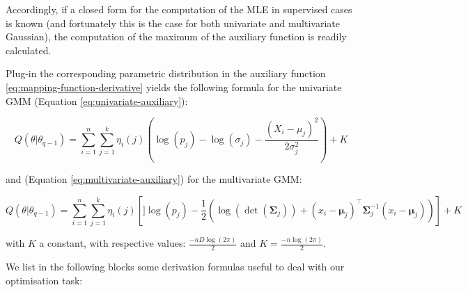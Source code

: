 Accordingly, if a closed form for the computation of the MLE in
supervised cases is known (and fortunately this is the case for both univariate and multivariate Gaussian), the computation of the maximum of the
auxiliary function is readily calculated.

Plug-in the corresponding parametric distribution in the auxiliary function \eqref{eq:mapping-function-derivative} yields the following formula for the univariate GMM (Equation
\eqref{eq:univariate-auxiliary}):

\begin{equation}
Q(\theta| \theta_{q-1}) = \sum_{i=1}^n \sum_{j=1}^k \eta_i(j) \left( \log (p_j) - \log (\sigma_j) - \frac{(X_i-\mu_j)^2}{2\sigma_j^2} \right) + K
\label{eq:univariate-auxiliary}
\end{equation}

and (Equation \eqref{eq:multivariate-auxiliary}) for the multivariate GMM:

\begin{equation}
Q(\theta| \theta_{q-1}) = \sum_{i=1}^n \sum_{j=1}^k \eta_i(j) \left[] \log (p_j) - \frac{1}{2} \left( \log(\operatorname{det}(\boldsymbol{\Sigma}_j)) + (x_i - \boldsymbol{\mu}_j)^\top \boldsymbol{\Sigma}_j^{-1}(x_i - \boldsymbol{\mu}_j)\right) \right] + K
\label{eq:multivariate-auxiliary}
\end{equation}

with \(K\) a constant, with respective values: \(\frac{-nD\log(2\pi)}{2}\) and \(K=\frac{-n\log(2\pi)}{2}\).

We list in the following blocks some derivation formulas useful to deal with our optimisation task:

